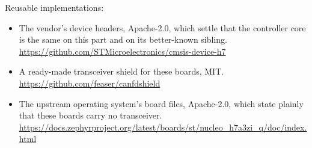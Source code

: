 Reusable implementations:
\begin{itemize}
\item The vendor's device headers, Apache-2.0, which settle that the controller
core is the same on this part and on its better-known sibling.\newline
\url{https://github.com/STMicroelectronics/cmsis-device-h7}
\item A ready-made transceiver shield for these boards, MIT.\newline
\url{https://github.com/feaser/canfdshield}
\item The upstream operating system's board files, Apache-2.0, which state
plainly that these boards carry no transceiver.\newline
\url{https://docs.zephyrproject.org/latest/boards/st/nucleo_h7a3zi_q/doc/index.html}
\end{itemize}
